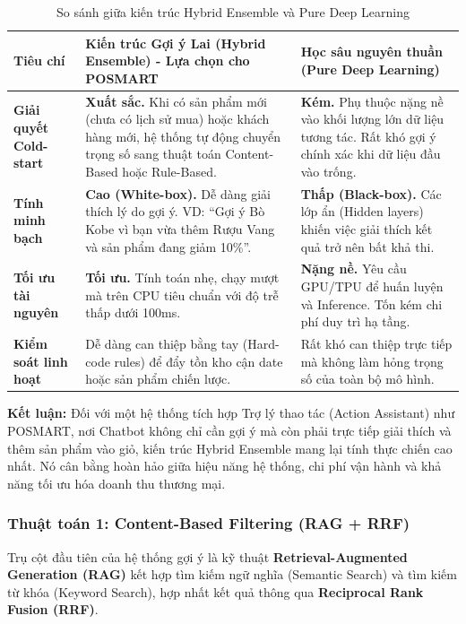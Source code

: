 \documentclass[12pt,a4paper]{report}
\begin{document}
\begin{table}[htbp]
\centering
\renewcommand{\arraystretch}{1.5}
\begin{tabularx}{\textwidth}{|l|X|X|}
\hline
\rowcolor[HTML]{EFEFEF}
\textbf{Tiêu chí} & \textbf{Kiến trúc Gợi ý Lai (Hybrid Ensemble) - Lựa chọn cho POSMART} & \textbf{Học sâu nguyên thuần (Pure Deep Learning)} \\ \hline
\textbf{Giải quyết Cold-start} & \textbf{Xuất sắc.} Khi có sản phẩm mới (chưa có lịch sử mua) hoặc khách hàng mới, hệ thống tự động chuyển trọng số sang thuật toán Content-Based hoặc Rule-Based. & \textbf{Kém.} Phụ thuộc nặng nề vào khối lượng lớn dữ liệu tương tác. Rất khó gợi ý chính xác khi dữ liệu đầu vào trống. \\ \hline
\textbf{Tính minh bạch} & \textbf{Cao (White-box).} Dễ dàng giải thích lý do gợi ý. VD: ``Gợi ý Bò Kobe vì bạn vừa thêm Rượu Vang và sản phẩm đang giảm 10\%''. & \textbf{Thấp (Black-box).} Các lớp ẩn (Hidden layers) khiến việc giải thích kết quả trở nên bất khả thi. \\ \hline
\textbf{Tối ưu tài nguyên} & \textbf{Tối ưu.} Tính toán nhẹ, chạy mượt mà trên CPU tiêu chuẩn với độ trễ thấp dưới 100ms. & \textbf{Nặng nề.} Yêu cầu GPU/TPU để huấn luyện và Inference. Tốn kém chi phí duy trì hạ tầng. \\ \hline
\textbf{Kiểm soát linh hoạt} & Dễ dàng can thiệp bằng tay (Hard-code rules) để đẩy tồn kho cận date hoặc sản phẩm chiến lược. & Rất khó can thiệp trực tiếp mà không làm hỏng trọng số của toàn bộ mô hình. \\ \hline
\end{tabularx}
\caption{So sánh giữa kiến trúc Hybrid Ensemble và Pure Deep Learning}
\end{table}
 
\textbf{Kết luận:} Đối với một hệ thống tích hợp Trợ lý thao tác (Action Assistant) như POSMART, nơi Chatbot không chỉ cần gợi ý mà còn phải trực tiếp giải thích và thêm sản phẩm vào giỏ, kiến trúc Hybrid Ensemble mang lại tính thực chiến cao nhất. Nó cân bằng hoàn hảo giữa hiệu năng hệ thống, chi phí vận hành và khả năng tối ưu hóa doanh thu thương mại.
 
\subsubsection{Thuật toán 1: Content-Based Filtering (RAG + RRF)}
 
Trụ cột đầu tiên của hệ thống gợi ý là kỹ thuật \textbf{Retrieval-Augmented Generation (RAG)} kết hợp tìm kiếm ngữ nghĩa (Semantic Search) và tìm kiếm từ khóa (Keyword Search), hợp nhất kết quả thông qua \textbf{Reciprocal Rank Fusion (RRF)}.
 
\end{document}
